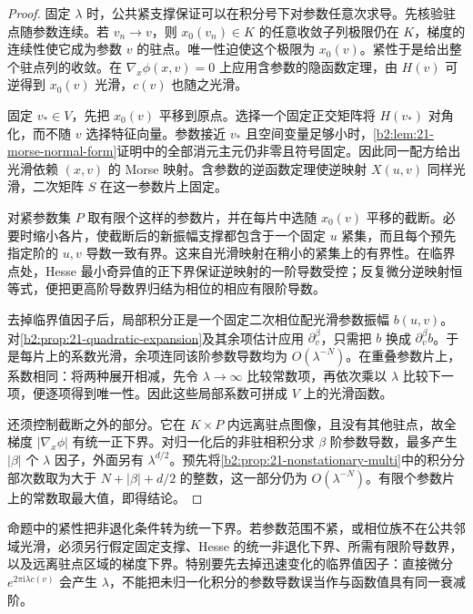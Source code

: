 \begin{proof}
固定 \(\lambda\) 时，公共紧支撑保证可以在积分号下对参数任意次求导。先核验驻点随参数连续。若 \(v_n\to v\)，则 \(x_0(v_n)\in K\) 的任意收敛子列极限仍在 \(K\)，梯度的连续性使它成为参数 \(v\) 的驻点。唯一性迫使这个极限为 \(x_0(v)\)。紧性于是给出整个驻点列的收敛。在
\(\nabla_x\phi(x,v)=0\) 上应用含参数的隐函数定理，由 \(H(v)\) 可逆得到 \(x_0(v)\) 光滑，\(c(v)\) 也随之光滑。

固定 \(v_*\in V\)，先把 \(x_0(v)\) 平移到原点。选择一个固定正交矩阵将 \(H(v_*)\) 对角化，而不随 \(v\) 选择特征向量。参数接近 \(v_*\) 且空间变量足够小时，\cref{b2:lem:21-morse-normal-form}证明中的全部消元主元仍非零且符号固定。因此同一配方给出光滑依赖 \((x,v)\) 的 Morse 映射。含参数的逆函数定理使逆映射 \(X(u,v)\) 同样光滑，二次矩阵 \(S\) 在这一参数片上固定。

对紧参数集 \(P\) 取有限个这样的参数片，并在每片中选随 \(x_0(v)\) 平移的截断。必要时缩小各片，使截断后的新振幅支撑都包含于一个固定 \(u\) 紧集，而且每个预先指定阶的 \(u,v\) 导数一致有界。这来自光滑映射在稍小的紧集上的有界性。在临界点处，Hesse 最小奇异值的正下界保证逆映射的一阶导数受控；反复微分逆映射恒等式，便把更高阶导数界归结为相位的相应有限阶导数。

去掉临界值因子后，局部积分正是一个固定二次相位配光滑参数振幅 \(b(u,v)\)。对\cref{b2:prop:21-quadratic-expansion}及其余项估计应用 \(\partial_v^\beta\)，只需把 \(b\) 换成 \(\partial_v^\beta b\)。于是每片上的系数光滑，余项连同该阶参数导数均为 \(O(\lambda^{-N})\)。在重叠参数片上，系数相同：将两种展开相减，先令 \(\lambda\to\infty\) 比较常数项，再依次乘以 \(\lambda\) 比较下一项，便逐项得到唯一性。因此这些局部系数可拼成 \(V\) 上的光滑函数。

还须控制截断之外的部分。它在 \(K\times P\) 内远离驻点图像，且没有其他驻点，故全梯度 \(|\nabla_x\phi|\) 有统一正下界。对归一化后的非驻相积分求 \(\beta\) 阶参数导数，最多产生 \(|\beta|\) 个 \(\lambda\) 因子，外面另有 \(\lambda^{d/2}\)。预先将\cref{b2:prop:21-nonstationary-multi}中的积分分部次数取为大于 \(N+|\beta|+d/2\) 的整数，这一部分仍为 \(O(\lambda^{-N})\)。有限个参数片上的常数取最大值，即得结论。
\end{proof}

命题中的紧性把非退化条件转为统一下界。若参数范围不紧，或相位族不在公共邻域光滑，必须另行假定固定支撑、Hesse 的统一非退化下界、所需有限阶导数界，以及远离驻点区域的梯度下界。特别要先去掉迅速变化的临界值因子：直接微分 \(e^{2\pi\mathrm i\lambda c(v)}\) 会产生 \(\lambda\)，不能把未归一化积分的参数导数误当作与函数值具有同一衰减阶。

